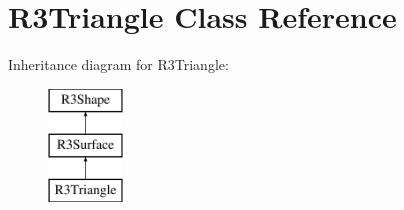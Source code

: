 \hypertarget{class_r3_triangle}{}\section{R3\+Triangle Class Reference}
\label{class_r3_triangle}
Inheritance diagram for R3\+Triangle\+:\begin{figure}[H]
\begin{center}
\leavevmode
\includegraphics[height=3.000000cm]{class_r3_triangle}
\end{center}
\end{figure}
